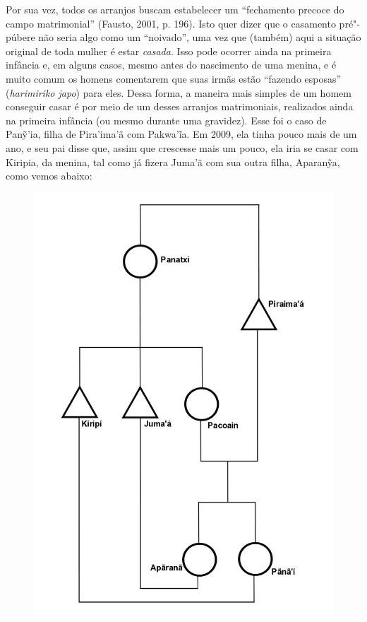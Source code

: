 Por sua vez, todos os arranjos buscam estabelecer um ``fechamento precoce
do campo matrimonial'' (Fausto, 2001, p. 196). Isto quer dizer que o
casamento pré"-púbere não seria algo como um ``noivado'', uma vez que
(também) aqui a situação original de toda mulher é estar \emph{casada}.
Isso pode ocorrer ainda na primeira infância e, em alguns casos, mesmo
antes do nascimento de uma menina, e é muito comum os homens comentarem
que suas irmãs estão ``fazendo esposas'' (\emph{harimiriko japo}) para
eles. Dessa forma, a maneira mais simples de um homem conseguir casar é
por meio de um desses arranjos matrimoniais, realizados ainda na
primeira infância (ou mesmo durante uma gravidez). Esse foi o caso de
Panỹ'ia, filha de Pira'ima'ã com Pakwa'ĩa. Em 2009, ela tinha pouco mais
de um ano, e seu pai disse que, assim que crescesse mais um pouco, ela
iria se casar com Kiripia,  da menina, tal como já fizera Juma'ã com
sua outra filha, Aparanỹa, como vemos abaixo:

\begin{figure}[H]
\centering
  \includegraphics[width=\textwidth]{./imgs/Figura_9}
\end{figure}

